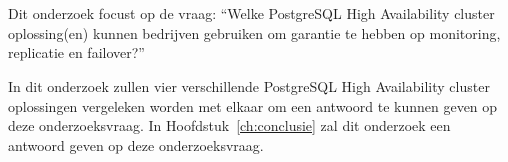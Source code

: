 
\section{}
\label{sec:onderzoeksvraag}

Dit onderzoek focust op de vraag: “Welke PostgreSQL High Availability cluster oplossing(en) kunnen bedrijven gebruiken om garantie te hebben op monitoring, replicatie en failover?”

In dit onderzoek zullen vier verschillende PostgreSQL High Availability cluster oplossingen vergeleken worden met elkaar om een antwoord te kunnen geven op deze onderzoeksvraag. In Hoofdstuk~\ref{ch:conclusie} zal dit onderzoek een antwoord geven op deze onderzoeksvraag.





